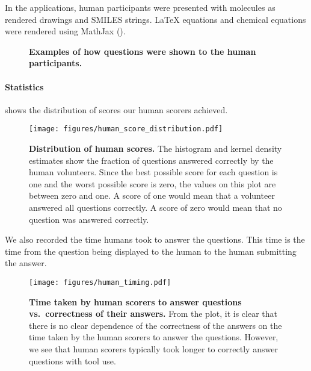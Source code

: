 In the applications, human participants were presented with molecules as rendered drawings and SMILES strings. \LaTeX\xspace equations and chemical equations were rendered using MathJax ().


\begin{figure}

    \caption{\textbf{Examples of how questions were shown to the human participants.}}
    \label{fig:screenshots}
\end{figure}

\paragraph{Statistics}
 shows the distribution of scores our human scorers achieved.

\begin{figure}[htb]
    \centering
    \texttt{[image: figures/human\_score\_distribution.pdf]}
    \caption{\textbf{Distribution of human scores.} The histogram and kernel density estimates show the fraction of questions answered correctly by the human volunteers.
    Since the best possible score for each question is one and the worst possible score is zero, the values on this plot are between zero and one. A score of one would mean that a volunteer answered all questions correctly. A score of zero would mean that no question was answered correctly.}
    \label{fig:human_score_distribution}
\end{figure}

We also recorded the time humans took to answer the questions. This time is the time from the question being displayed to the human to the human submitting the answer.

\begin{figure}[htb]
    \centering
    \texttt{[image: figures/human\_timing.pdf]}
    \caption{\textbf{Time taken by human scorers to answer questions vs.\ correctness of their answers.} From the plot, it is clear that there is no clear dependence of the correctness of the answers on the time taken by the human scorers to answer the questions. However, we see that human scorers typically took longer to correctly answer questions with tool use.}
    \label{fig:human_timing}
\end{figure}

